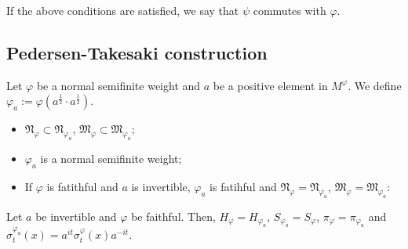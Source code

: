 \begin{definition}
  If the above conditions are satisfied, we say that $\psi$ commutes with $\varphi$.
\end{definition}  

\subsection{Pedersen-Takesaki construction}

\begin{definition}
  Let $\varphi$ be a normal semifinite weight and $a$ be a positive element in $M^\varphi$.
  We define $\varphi_a := \varphi(a^{\frac{1}{2}} \cdot a^{\frac{1}{2}})$.
\end{definition}

\begin{remark}
  \begin{itemize}
    \item $\mathfrak{N}_\varphi \subset \mathfrak{N}_{\varphi_a}$, $\mathfrak{M}_\varphi \subset \mathfrak{M}_{\varphi_a}$;
    \item $\varphi_a$ is a normal semifinite weight;
    \item If $\varphi$ is fatithful and $a$ is invertible, $\varphi_a$ is fatihful and $\mathfrak{N}_\varphi = \mathfrak{N}_{\varphi_a}$, $\mathfrak{M}_\varphi = \mathfrak{M}_{\varphi_a}$:
  \end{itemize}
\end{remark}

\begin{theorem}
  Let $a$ be invertible and $\varphi$ be faithful.
  Then, $H_\varphi = H_{\varphi_a}$, $S_{\varphi_a} = S_\varphi$, $\pi_\varphi = \pi_{\varphi_a}$ and $\sigma_t^{\varphi_a}(x) = a^{it}\sigma_t^\varphi(x) a^{-it}$.
\end{theorem}

